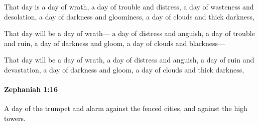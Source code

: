 			\begin{versebox}
					\item[BHS] 
					\item[LXX] 
					\item[ASV] That day is a day of wrath, a day of trouble and distress, a day of wasteness and desolation, a day of darkness and gloominess, a day of clouds and thick darkness,
					\item[NIV] That day will be a day of wrath— a day of distress and anguish, a day of trouble and ruin, a day of darkness and gloom, a day of clouds and blackness—
					\item[NRSV] That day will be a day of wrath, a day of distress and anguish, a day of ruin and devastation, a day of darkness and gloom, a day of clouds and thick darkness,
			\end{versebox}

		\paragraph{Zephaniah 1:16} %
			\label{ZEPHANIAH-1-16}

			A day of the trumpet and alarm against the fenced cities, and against the high towers.


